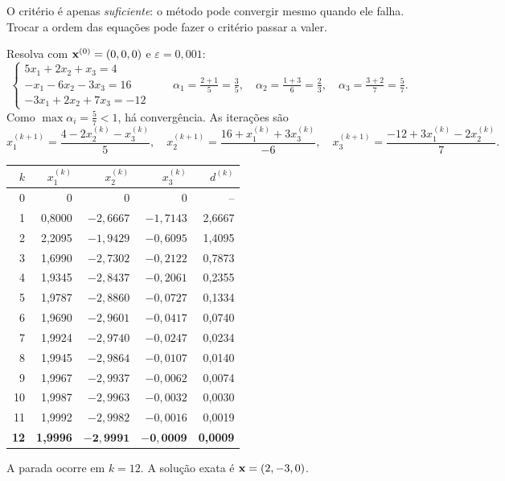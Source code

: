 O critério é apenas \emph{suficiente}: o método pode convergir mesmo quando ele falha.
Trocar a ordem das equações pode fazer o critério passar a valer.

\begin{exemplo}
Resolva com $\mathbf{x}^{(0)}=(0,0,0)$ e $\varepsilon=0{,}001$:
\[
\begin{cases}
5x_1+2x_2+x_3=4\\
-x_1-6x_2-3x_3=16\\
-3x_1+2x_2+7x_3=-12
\end{cases}
\qquad
\alpha_1=\tfrac{2+1}{5}=\tfrac35,\quad
\alpha_2=\tfrac{1+3}{6}=\tfrac23,\quad
\alpha_3=\tfrac{3+2}{7}=\tfrac57.
\]
Como $\max\alpha_i=\frac57<1$, há convergência. As iterações são
\[
x_1^{(k+1)}=\frac{4-2x_2^{(k)}-x_3^{(k)}}{5},\quad
x_2^{(k+1)}=\frac{16+x_1^{(k)}+3x_3^{(k)}}{-6},\quad
x_3^{(k+1)}=\frac{-12+3x_1^{(k)}-2x_2^{(k)}}{7}.
\]
\begin{center}
\begin{tabular}{rrrrr}
\toprule
$k$ & $x_1^{(k)}$ & $x_2^{(k)}$ & $x_3^{(k)}$ & $d^{(k)}$\\
\midrule
0 & 0 & 0 & 0 & --\\
1 & 0{,}8000 & $-2{,}6667$ & $-1{,}7143$ & 2{,}6667\\
2 & 2{,}2095 & $-1{,}9429$ & $-0{,}6095$ & 1{,}4095\\
3 & 1{,}6990 & $-2{,}7302$ & $-0{,}2122$ & 0{,}7873\\
4 & 1{,}9345 & $-2{,}8437$ & $-0{,}2061$ & 0{,}2355\\
5 & 1{,}9787 & $-2{,}8860$ & $-0{,}0727$ & 0{,}1334\\
6 & 1{,}9690 & $-2{,}9601$ & $-0{,}0417$ & 0{,}0740\\
7 & 1{,}9924 & $-2{,}9740$ & $-0{,}0247$ & 0{,}0234\\
8 & 1{,}9945 & $-2{,}9864$ & $-0{,}0107$ & 0{,}0140\\
9 & 1{,}9967 & $-2{,}9937$ & $-0{,}0062$ & 0{,}0074\\
10 & 1{,}9987 & $-2{,}9963$ & $-0{,}0032$ & 0{,}0030\\
11 & 1{,}9992 & $-2{,}9982$ & $-0{,}0016$ & 0{,}0019\\
\textbf{12} & \textbf{1{,}9996} & $\mathbf{-2{,}9991}$ & $\mathbf{-0{,}0009}$ & \textbf{0{,}0009}\\
\bottomrule
\end{tabular}
\end{center}
A parada ocorre em $k=12$. A solução exata é $\mathbf{x}=(2,-3,0)$.
\end{exemplo}

